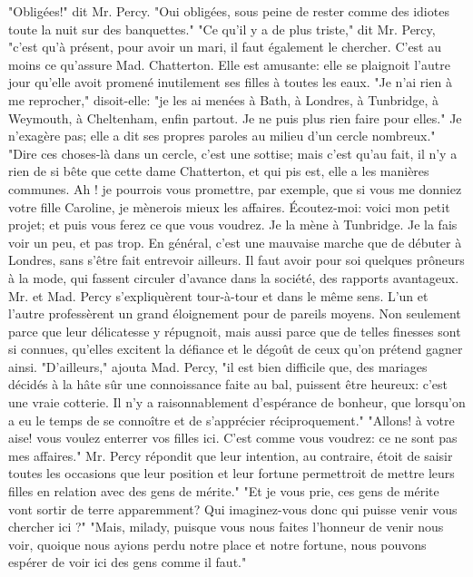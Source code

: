 "Obligées!" dit Mr. Percy.
"Oui obligées, sous peine de rester comme des idiotes toute la nuit sur des banquettes."
"Ce qu'il y a de plus triste," dit Mr. Percy, "c'est qu'à présent, pour avoir un mari, il faut également le chercher. C'est au moins ce qu'assure Mad. Chatterton. Elle est amusante: elle se plaignoit l'autre jour qu'elle avoit promené inutilement ses filles à toutes les eaux. "Je n'ai rien à me reprocher," disoit-elle: "je les ai menées à Bath, à Londres, à Tunbridge, à Weymouth, à Cheltenham, enfin partout. Je ne puis plus rien faire pour elles." Je n'exagère pas; elle a dit ses propres paroles au milieu d'un cercle nombreux."
"Dire ces choses-là dans un cercle, c'est\setcounter{page}{391} une sottise; mais c'est qu'au fait, il n'y a rien de si bête que cette dame Chatterton, et qui pis est, elle a les manières communes. Ah ! je pourrois vous promettre, par exemple, que si vous me donniez votre fille Caroline, je mènerois mieux les affaires. Écoutez-moi: voici mon petit projet; et puis vous ferez ce que vous voudrez. Je la mène à Tunbridge. Je la fais voir un peu, et pas trop. En général, c'est une mauvaise marche que de débuter à Londres, sans s'être fait entrevoir ailleurs. Il faut avoir pour soi quelques prôneurs à la mode, qui fassent circuler d'avance dans la société, des rapports avantageux.
Mr. et Mad. Percy s'expliquèrent tour-à-tour et dans le même sens. L'un et l'autre professèrent un grand éloignement pour de pareils moyens. Non seulement parce que leur délicatesse y répugnoit, mais aussi parce que de telles finesses sont si connues, qu'elles excitent la défiance et le dégoût de ceux qu'on prétend gagner ainsi. "D'ailleurs," ajouta Mad. Percy, "il est bien difficile que, des mariages décidés à la hâte sûr une connoissance faite au bal, puissent être heureux: c'est une vraie cotterie. Il n'y a raisonnablement d'espérance de bonheur, que lorsqu'on a eu le temps de\setcounter{page}{392} se connoître et de s'apprécier réciproquement."
"Allons! à votre aise! vous voulez enterrer vos filles ici. C'est comme vous voudrez: ce ne sont pas mes affaires."
Mr. Percy répondit que leur intention, au contraire, étoit de saisir toutes les occasions que leur position et leur fortune permettroit de mettre leurs filles en relation avec des gens de mérite."
"Et je vous prie, ces gens de mérite vont sortir de terre apparemment? Qui imaginez-vous donc qui puisse venir vous chercher ici ?"
"Mais, milady, puisque vous nous faites l'honneur de venir nous voir, quoique nous ayions perdu notre place et notre fortune, nous pouvons espérer de voir ici des gens comme il faut."
